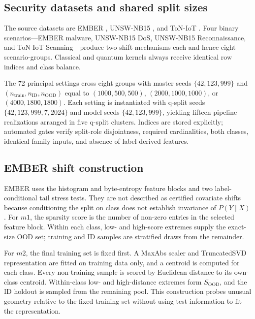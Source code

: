 \documentclass[referee,lineno,pdflatex,sn-vancouver-num]{sn-jnl}
\theoremstyle{thmstyleone}%
\theoremstyle{thmstyletwo}%
\theoremstyle{thmstylethree}%
\begin{document}
\subsection{Security datasets and shared split sizes}

The source datasets are EMBER \cite{anderson2018ember}, UNSW-NB15 \cite{moustafa2015unsw}, and ToN-IoT \cite{alsaedi2020toniot}. Four binary scenarios---EMBER malware, UNSW-NB15 DoS, UNSW-NB15 Reconnaissance, and ToN-IoT Scanning---produce two shift mechanisms each and hence eight scenario-groups. Classical and quantum kernels always receive identical row indices and class balance.

The 72 principal settings cross eight groups with master seeds $\{42,123,999\}$ and $(n_{\mathrm{train}},n_{\mathrm{ID}},n_{\mathrm{OOD}})$ equal to $(1000,500,500)$, $(2000,1000,1000)$, or $(4000,1800,1800)$. Each setting is instantiated with q-split seeds $\{42,123,999,7,2024\}$ and model seeds $\{42,123,999\}$, yielding fifteen pipeline realizations arranged in five q-split clusters. Indices are stored explicitly; automated gates verify split-role disjointness, required cardinalities, both classes, identical family inputs, and absence of label-derived features.

\subsection{EMBER shift construction}

EMBER uses the histogram and byte-entropy feature blocks and two label-conditional tail stress tests. They are not described as certified covariate shifts because conditioning the split on class does not establish invariance of $P(Y\mid X)$. For $m1$, the sparsity score is the number of non-zero entries in the selected feature block. Within each class, low- and high-score extremes supply the exact-size OOD set; training and ID samples are stratified draws from the remainder.

For $m2$, the final training set is fixed first. A MaxAbs scaler and TruncatedSVD representation are fitted on training data only, and a centroid is computed for each class. Every non-training sample is scored by Euclidean distance to its own-class centroid. Within-class low- and high-distance extremes form $S_{\mathrm{OOD}}$, and the ID holdout is sampled from the remaining pool. This construction probes unusual geometry relative to the fixed training set without using test information to fit the representation.
\end{document}
